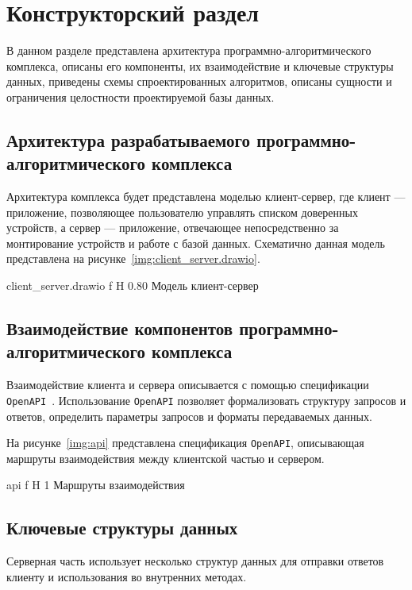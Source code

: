 \chapter{Конструкторский раздел}

В данном разделе представлена архитектура программно-алгоритмического комплекса,
описаны его компоненты, их взаимодействие и ключевые структуры данных, приведены 
схемы спроектированных алгоритмов, описаны сущности и ограничения целостности проектируемой базы данных.

\section{Архитектура разрабатываемого программно-алгоритмического комплекса}

Архитектура комплекса будет представлена моделью клиент-сервер, где клиент ---
приложение, позволяющее пользователю управлять списком доверенных устройств, а сервер
--- приложение, отвечающее непосредственно за монтирование устройств и работе с базой 
данных. Схематично данная модель представлена на рисунке~\ref{img:client_server.drawio}.

    {client_server.drawio}
    {f}
    {H}
    {0.80\textwidth}
    {Модель клиент-сервер}

\section{Взаимодействие компонентов программно-алгоритмического комплекса}

Взаимодействие клиента и сервера описывается с помощью спецификации \texttt{OpenAPI}~\cite{OpenAPI}. 
Использование \texttt{OpenAPI} позволяет формализовать структуру запросов и ответов, определить 
параметры запросов и форматы передаваемых данных. 

На рисунке~\ref{img:api} представлена спецификация \texttt{OpenAPI}, 
описывающая маршруты взаимодействия между клиентской частью и сервером.

    {api}
    {f}
    {H}
    {1\textwidth}
    {Маршруты взаимодействия}

\section{Ключевые структуры данных}

Серверная часть использует несколько структур данных для отправки ответов клиенту и 
использования во внутренних методах.

